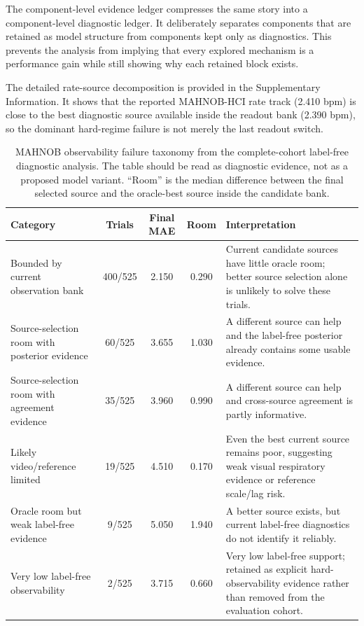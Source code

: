 \documentclass[fleqn,10pt]{wlscirep}
\begin{document}
The component-level evidence ledger compresses the same story into a
component-level diagnostic ledger. It deliberately separates components
that are retained as model structure from components kept only as diagnostics.
This prevents the analysis from implying that every explored mechanism is a
performance gain while still showing why each retained block exists.

The detailed rate-source decomposition is provided in the Supplementary
Information.
It shows that the reported MAHNOB-HCI rate track (2.410 bpm) is close to the
best diagnostic source available inside the readout bank (2.390 bpm), so the
dominant hard-regime failure is not merely the last readout switch.

\begin{table}[H]
\centering
\caption{MAHNOB observability failure taxonomy from the complete-cohort label-free
diagnostic analysis. The table should be read as diagnostic evidence, not as a proposed model
variant. ``Room'' is the
median difference between the final selected source and the oracle-best source
inside the candidate bank.}
\label{tab:observability_taxonomy}
\footnotesize
\setlength{\tabcolsep}{4pt}
\renewcommand{\arraystretch}{1.12}
\begin{tabular}{L{4.0cm}cccL{5.1cm}}
\toprule
Category & Trials & Final MAE & Room & Interpretation \\
\midrule
Bounded by current observation bank & 400/525 & 2.150 & 0.290 & Current candidate sources have little oracle room; better source selection alone is unlikely to solve these trials. \\
Source-selection room with posterior evidence & 60/525 & 3.655 & 1.030 & A different source can help and the label-free posterior already contains some usable evidence. \\
Source-selection room with agreement evidence & 35/525 & 3.960 & 0.990 & A different source can help and cross-source agreement is partly informative. \\
Likely video/reference limited & 19/525 & 4.510 & 0.170 & Even the best current source remains poor, suggesting weak visual respiratory evidence or reference scale/lag risk. \\
Oracle room but weak label-free evidence & 9/525 & 5.050 & 1.940 & A better source exists, but current label-free diagnostics do not identify it reliably. \\
Very low label-free observability & 2/525 & 3.715 & 0.660 & Very low label-free support; retained as explicit hard-observability evidence rather than removed from the evaluation cohort. \\
\bottomrule
\end{tabular}
\renewcommand{\arraystretch}{1.0}
\end{table}
\FloatBarrier
\end{document}
